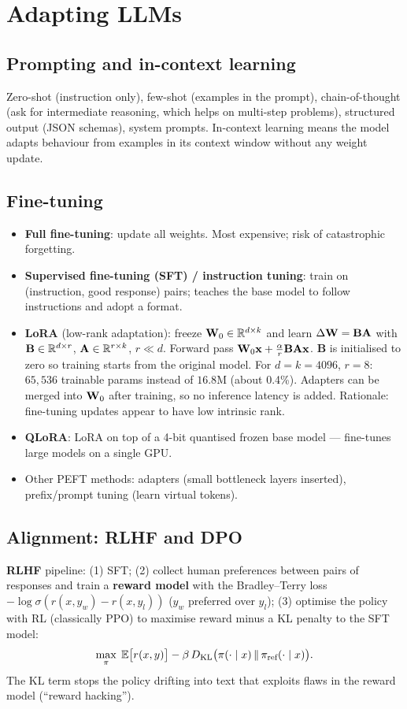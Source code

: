 \section{Adapting LLMs}

\subsection{Prompting and in-context learning}
Zero-shot (instruction only), few-shot (examples in the prompt), chain-of-thought (ask for intermediate reasoning, which helps on multi-step problems), structured output (JSON schemas), system prompts. In-context learning means the model adapts behaviour from examples in its context window without any weight update.

\subsection{Fine-tuning}
\begin{itemize}
  \item \textbf{Full fine-tuning}: update all weights. Most expensive; risk of catastrophic forgetting.
  \item \textbf{Supervised fine-tuning (SFT) / instruction tuning}: train on (instruction, good response) pairs; teaches the base model to follow instructions and adopt a format.
  \item \textbf{LoRA} (low-rank adaptation): freeze $\mathbf{W}_0\in\mathbb{R}^{d\times k}$ and learn $\Delta\mathbf{W}=\mathbf{B}\mathbf{A}$ with $\mathbf{B}\in\mathbb{R}^{d\times r}$, $\mathbf{A}\in\mathbb{R}^{r\times k}$, $r\ll d$. Forward pass $\mathbf{W}_0\mathbf{x}+\frac{\alpha}{r}\mathbf{B}\mathbf{A}\mathbf{x}$. $\mathbf{B}$ is initialised to zero so training starts from the original model. For $d=k=4096$, $r=8$: $65{,}536$ trainable params instead of $16.8$M (about 0.4\%). Adapters can be merged into $\mathbf{W}_0$ after training, so no inference latency is added. Rationale: fine-tuning updates appear to have low intrinsic rank.
  \item \textbf{QLoRA}: LoRA on top of a 4-bit quantised frozen base model --- fine-tunes large models on a single GPU.
  \item Other PEFT methods: adapters (small bottleneck layers inserted), prefix/prompt tuning (learn virtual tokens).
\end{itemize}

\subsection{Alignment: RLHF and DPO}
\textbf{RLHF} pipeline: (1) SFT; (2) collect human preferences between pairs of responses and train a \textbf{reward model} with the Bradley--Terry loss $-\log\sigma(r(x,y_w)-r(x,y_l))$ ($y_w$ preferred over $y_l$); (3) optimise the policy with RL (classically PPO) to maximise reward minus a KL penalty to the SFT model:
\[\max_\pi\;\mathbb{E}\big[r(x,y)\big]-\beta\,D_{\mathrm{KL}}\big(\pi(\cdot\mid x)\,\|\,\pi_{\text{ref}}(\cdot\mid x)\big).\]
The KL term stops the policy drifting into text that exploits flaws in the reward model (``reward hacking'').

